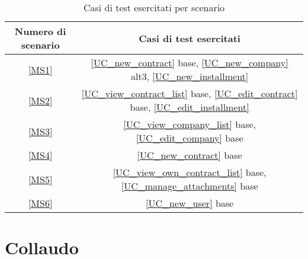 \begin{table}[h]
\caption{Casi di test esercitati per scenario}
\label{macro_scenari}
\centering
  \begin{tabular}{| c | c |} 
    \hline
    Numero di scenario & Casi di test esercitati \\
    \hline
    \ref{MS1} & \ref{UC_new_contract} base, \ref{UC_new_company} alt3, \ref{UC_new_installment}\\
    \hline
    \ref{MS2} & \ref{UC_view_contract_list} base, \ref{UC_edit_contract} base, \ref{UC_edit_installment} \\
    \hline
    \ref{MS3} & \ref{UC_view_company_list} base, \ref{UC_edit_company} base \\
    \hline
    \ref{MS4} & \ref{UC_new_contract} base\\
    \hline
    \ref{MS5} & \ref{UC_view_own_contract_list} base, \ref{UC_manage_attachments} base\\
    \hline
    \ref{MS6} & \ref{UC_new_user} base\\
    \hline
  \end{tabular} 

\end{table} 

\section{Collaudo}

